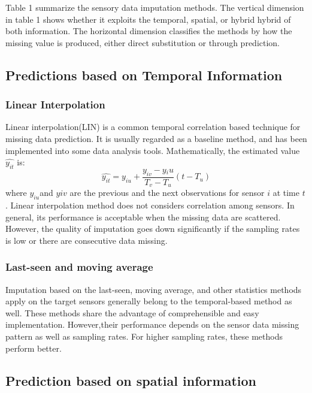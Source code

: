 Table 1 summarize the sensory data imputation methods. 
The vertical dimension in table 1 shows whether it exploits the temporal, spatial, or hybrid hybrid of both information. 
The horizontal dimension classifies the methods by how the missing value is produced, either direct substitution or through prediction. 

\subsection{Predictions based on Temporal Information }
\subsubsection{Linear Interpolation}
Linear interpolation(LIN) is a common temporal correlation based technique for missing data prediction. 
It is usually regarded as a baseline method, and has been implemented into some data analysis tools. Mathematically, the estimated value $\hat{y_{it}}$ is:
\begin{equation}
\hat{y_{it}} = y_{iu} + \frac{y_{iv}-y{_iu}}{T_v-T_u}(t-T_u)
\end{equation}
where $y_{iu}$and $y{iv}$ are the previous and the next observations for sensor $i$ at time $t$. 
Linear interpolation method does not considers correlation among sensors.
In general, its performance is acceptable when the missing data are scattered. 
However, the quality of imputation goes down significantly if the sampling rates is low or there are consecutive data missing. 
\subsubsection{Last-seen and moving average}
Imputation based on the last-seen, moving average, and other statistics methods apply on the target sensors generally belong to the temporal-based method as well.
These methods share the advantage of comprehensible and easy implementation. 
However,their performance depends on the sensor data missing pattern as well as sampling rates. For higher sampling rates, these methods perform better.   
\subsection{Prediction based on spatial information}


